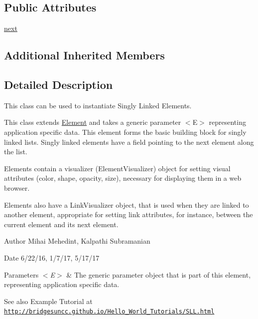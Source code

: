\subsection*{Public Attributes}
\begin{DoxyCompactItemize}
\item 
\hyperlink{class_s_lelement_1_1_s_lelement_a2d83afedba3b70183c90c3454ac99a29}{next}
\end{DoxyCompactItemize}
\subsection*{Additional Inherited Members}


\subsection{Detailed Description}
This class can be used to instantiate Singly Linked Elements. 

This class extends \hyperlink{namespace_element}{Element} and takes a generic parameter $<$\+E$>$ representing application specific data. This element forms the basic building block for singly linked lists. Singly linked elements have a field pointing to the next element along the list.

\begin{DoxyVerb}Elements contain a visualizer (ElementVisualizer) object for setting visual
attributes (color, shape, opacity, size), necessary for displaying them in a
web browser.

Elements also have a LinkVisualizer object, that is used when they are linked to
another element, appropriate for setting link attributes, for instance, between
the current element and its next element.
\end{DoxyVerb}


\begin{DoxyAuthor}{Author}
Mihai Mehedint, Kalpathi Subramanian
\end{DoxyAuthor}
\begin{DoxyDate}{Date}
6/22/16, 1/7/17, 5/17/17
\end{DoxyDate}

\begin{DoxyParams}{Parameters}
{\em $<$\+E$>$} & The generic parameter object that is part of this element, representing application specific data.\\
\hline
\end{DoxyParams}
\begin{DoxySeeAlso}{See also}
Example Tutorial at ~\newline
 \href{http://bridgesuncc.github.io/Hello_World_Tutorials/SLL.html}{\tt http\+://bridgesuncc.\+github.\+io/\+Hello\+\_\+\+World\+\_\+\+Tutorials/\+S\+L\+L.\+html} 
\end{DoxySeeAlso}


